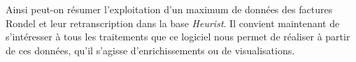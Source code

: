 \vspace{1.5cm}

Ainsi peut-on résumer l'exploitation d'un maximum de données des factures Rondel et leur retranscription dans la base \emph{Heurist}. Il convient maintenant de s'intéresser à tous les traitements que ce logiciel nous permet de réaliser à partir de ces données, qu'il s'agisse d'enrichissements ou de visualisations. 
